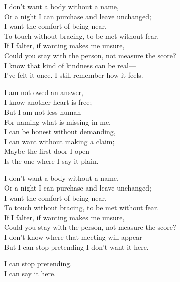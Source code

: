\begin{lyrics}
I don't want a body without a name,\\
Or a night I can purchase and leave unchanged;\\
I want the comfort of being near,\\
To touch without bracing, to be met without fear.\\
If I falter, if wanting makes me unsure,\\
Could you stay with the person, not measure the score?\\
I know that kind of kindness can be real—\\
I've felt it once. I still remember how it feels.

I am not owed an answer,\\
I know another heart is free;\\
But I am not less human\\
For naming what is missing in me.\\
I can be honest without demanding,\\
I can want without making a claim;\\
Maybe the first door I open\\
Is the one where I say it plain.

I don't want a body without a name,\\
Or a night I can purchase and leave unchanged;\\
I want the comfort of being near,\\
To touch without bracing, to be met without fear.\\
If I falter, if wanting makes me unsure,\\
Could you stay with the person, not measure the score?\\
I don't know where that meeting will appear—\\
But I can stop pretending I don't want it here.

I can stop pretending.\\
I can say it here.
\end{lyrics}

